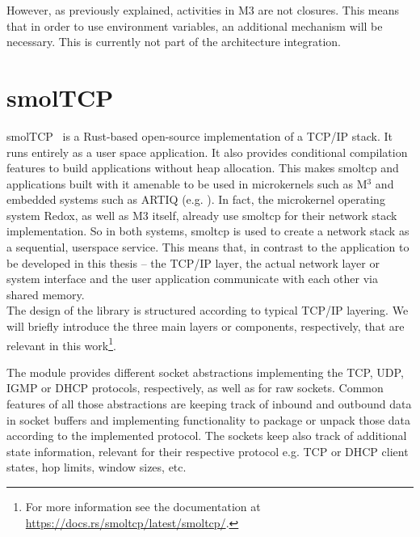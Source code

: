 However, as previously explained, activities in M3 are not closures. This means that in order to use environment variables, an additional mechanism will be necessary. This is currently not part of the architecture integration.

\section{smolTCP}
smolTCP~\cite{smolTCP} is a Rust-based open-source implementation of a TCP/IP stack. It runs entirely as a user space application. It also provides conditional compilation features to build applications without heap allocation. This makes smoltcp and applications built with it amenable to be used in microkernels such as M$^3$\cite{Asmussen:M3v} and embedded systems such as ARTIQ (e.g. \cite{lam2021combining}). In fact, the microkernel operating system Redox\cite{redoxwebsite}, as well as M3 itself, already use smoltcp for their network stack implementation. So in both systems, smoltcp is used to create a network stack as a sequential, userspace service. This means that, in contrast to the application to be developed in this thesis -- the TCP/IP layer, the actual network layer or system interface and the user application communicate with each other via shared memory. \\

The design of the library is structured according to typical TCP/IP layering. We will briefly introduce the three main layers or components, respectively, that are relevant in this work\footnote{For more information see the documentation at \url{https://docs.rs/smoltcp/latest/smoltcp/}.}.


The  module provides different socket abstractions implementing the TCP, UDP, IGMP or DHCP protocols, respectively, as well as for raw sockets. Common features of all those abstractions are keeping track of inbound and outbound data in socket buffers and implementing functionality to package or unpack those data according to the implemented protocol. The sockets keep also track of additional state information, relevant for their respective protocol e.g. TCP or DHCP client states, hop limits, window sizes, etc.\\

